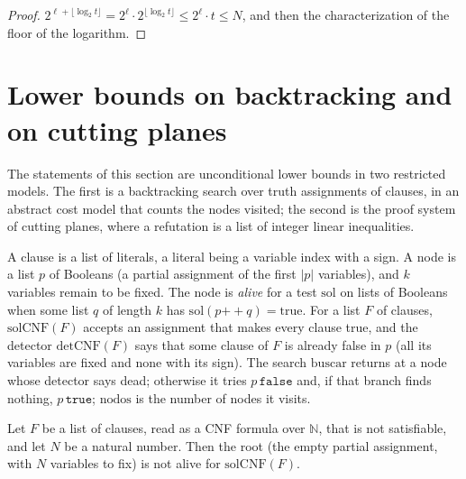 \begin{proof}
  \leanok
  $2^{\ell + \lfloor \log_2 t \rfloor} = 2^\ell \cdot 2^{\lfloor \log_2 t \rfloor} \le 2^\ell \cdot t
  \le N$, and then the characterization of the floor of the logarithm.
\end{proof}

\section{Lower bounds on backtracking and on cutting planes}
\label{sec:structure-bounds}

The statements of this section are unconditional lower bounds in two restricted models. The first
is a backtracking search over truth assignments of clauses, in an abstract cost model that counts
the nodes visited; the second is the proof system of cutting planes, where a refutation is a list of
integer linear inequalities.

\begin{definition}
  \label{def:structure-backtracking}
  \leanok
  A clause is a list of literals, a literal being a variable index with a sign. A node is a list $p$
  of Booleans (a partial assignment of the first $|p|$ variables), and $k$ variables remain to be
  fixed. The node is \emph{alive} for a test $\mathrm{sol}$ on lists of Booleans when some list
  $q$ of length $k$ has $\mathrm{sol}(p \mathbin{+\!\!+} q) = \mathrm{true}$. For a list $F$ of
  clauses, $\mathrm{solCNF}(F)$ accepts an assignment that makes every clause true, and the
  detector $\mathrm{detCNF}(F)$ says that some clause of $F$ is already false in $p$ (all its
  variables are fixed and none with its sign). The search $\mathrm{buscar}$ returns at a node whose
  detector says dead; otherwise it tries $p\,\mathtt{false}$ and, if that branch finds nothing,
  $p\,\mathtt{true}$; $\mathrm{nodos}$ is the number of nodes it visits.
  \own{}
\end{definition}

\begin{lemma}
  \label{lem:structure-raiz-muerta}
  \leanok
  Let $F$ be a list of clauses, read as a CNF formula over $\mathbb{N}$, that is not satisfiable,
  and let $N$ be a natural number. Then the root (the empty partial assignment, with $N$ variables
  to fix) is not alive for $\mathrm{solCNF}(F)$.
\end{lemma}

